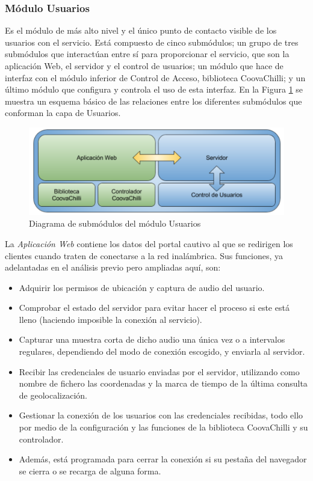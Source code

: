 \subsubsection{Módulo Usuarios}
Es el módulo de más alto nivel y el único punto de contacto visible de los usuarios con el servicio. Está compuesto de cinco submódulos; un grupo de tres submódulos que interactúan entre sí para proporcionar el servicio, que son la aplicación Web, el servidor y el control de usuarios; un módulo que hace de interfaz con el módulo inferior de Control de Acceso, biblioteca CoovaChilli; y un último módulo que configura y controla el uso de esta interfaz. En la Figura \ref{moduloUsers} se muestra un esquema básico de las relaciones entre los diferentes submódulos que conforman la capa de Usuarios.

\begin{figure}[!t]
\begin{center}
\includegraphics[width=0.75\linewidth]{./4_AnalisisFuncional/Img/moduloUsers.png}
\end{center}
\caption{Diagrama de submódulos del módulo Usuarios}
\label{moduloUsers}
\end{figure}

La \emph{Aplicación Web} contiene los datos del portal cautivo al que se redirigen los clientes cuando traten de conectarse a la red inalámbrica. Sus funciones, ya adelantadas en el análisis previo pero ampliadas aquí, son:

\begin{itemize}
\item Adquirir los permisos de ubicación y captura de audio del usuario.
\item Comprobar el estado del servidor para evitar hacer el proceso si este está lleno (haciendo imposible la conexión al servicio).
\item Capturar una muestra corta de dicho audio una única vez o a intervalos regulares, dependiendo del modo de conexión escogido, y enviarla al servidor.
\item Recibir las credenciales de usuario enviadas por el servidor, utilizando como nombre de fichero las coordenadas y la marca de tiempo de la última consulta de geolocalización.
\item Gestionar la conexión de los usuarios con las credenciales recibidas, todo ello por medio de la configuración y las funciones de la biblioteca CoovaChilli y su controlador.
\item Además, está programada para cerrar la conexión si su pestaña del navegador se cierra o se recarga de alguna forma.
\end{itemize}

